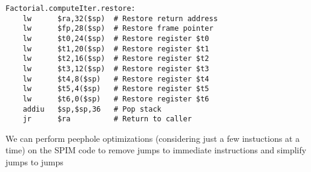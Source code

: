 \documentclass[8pt,a4paper,compress]{beamer}
\begin{document}
\begin{frame}[fragile]
\begin{lstlisting}[language={}]
Factorial.computeIter.restore:                                                                                                                                                                                                                
    lw      $ra,32($sp)  # Restore return address                                                                                                                                                                                             
    lw      $fp,28($sp)  # Restore frame pointer                                                                                                                                                                                              
    lw      $t0,24($sp)  # Restore register $t0
    lw      $t1,20($sp)  # Restore register $t1                                                                                                                                                                                               
    lw      $t2,16($sp)  # Restore register $t2
    lw      $t3,12($sp)  # Restore register $t3                                                                                                                                                                                               
    lw      $t4,8($sp)   # Restore register $t4
    lw      $t5,4($sp)   # Restore register $t5                                                                                                                                                                                               
    lw      $t6,0($sp)   # Restore register $t6
    addiu   $sp,$sp,36   # Pop stack
    jr      $ra          # Return to caller
\end{lstlisting}

\pause
\bigskip

We can perform peephole optimizations (considering just a few instuctions at a time) on the SPIM code to remove jumps to immediate instructions and simplify jumps to jumps
\end{frame}
\end{document}
